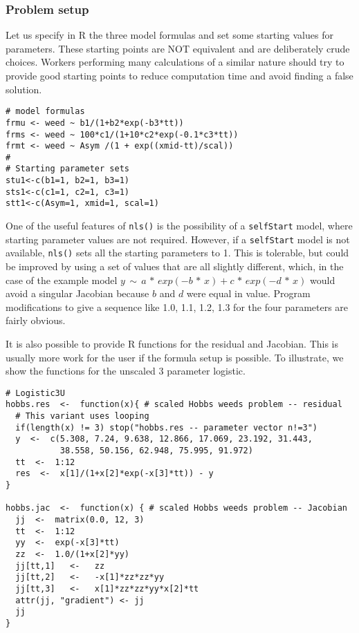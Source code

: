\hypertarget{problem-setup}{%
\subsubsection{Problem setup}\label{problem-setup}}

Let us specify in R the three model formulas and set some starting
values for parameters. These starting points are NOT equivalent and
are deliberately crude choices. Workers performing many calculations
of a similar nature should try to provide good starting points to reduce
computation time and avoid finding a false solution.

\begin{verbatim}
# model formulas
frmu <- weed ~ b1/(1+b2*exp(-b3*tt))
frms <- weed ~ 100*c1/(1+10*c2*exp(-0.1*c3*tt))
frmt <- weed ~ Asym /(1 + exp((xmid-tt)/scal))
#
# Starting parameter sets
stu1<-c(b1=1, b2=1, b3=1)
sts1<-c(c1=1, c2=1, c3=1)
stt1<-c(Asym=1, xmid=1, scal=1)
\end{verbatim}

One of the useful features of \texttt{nls()} is the possibility of a \texttt{selfStart} model,
where starting parameter values are not required. However, if a \texttt{selfStart} model
is not available, \texttt{nls()} sets all the starting parameters
to 1. This is tolerable, but could be improved by using a set of values
that are all slightly different, which, in the case of the example
model \(y \,\sim\, a \,*\, exp(-b \,*\, x) + c\,*\,exp(-d \,*\, x)\)
would avoid a singular Jacobian because \(b\) and \(d\) were equal in value.
Program modifications to give a sequence like 1.0, 1.1, 1.2, 1.3 for the four
parameters are fairly obvious.

It is also possible to provide R functions for the residual and Jacobian.
This is usually more work for the user if the formula setup is possible.
To illustrate, we show the functions for the unscaled 3 parameter logistic.

\begin{verbatim}
# Logistic3U
hobbs.res  <-  function(x){ # scaled Hobbs weeds problem -- residual
  # This variant uses looping
  if(length(x) != 3) stop("hobbs.res -- parameter vector n!=3")
  y  <-  c(5.308, 7.24, 9.638, 12.866, 17.069, 23.192, 31.443, 
           38.558, 50.156, 62.948, 75.995, 91.972)
  tt  <-  1:12
  res  <-  x[1]/(1+x[2]*exp(-x[3]*tt)) - y
}

hobbs.jac  <-  function(x) { # scaled Hobbs weeds problem -- Jacobian
  jj  <-  matrix(0.0, 12, 3)
  tt  <-  1:12
  yy  <-  exp(-x[3]*tt)
  zz  <-  1.0/(1+x[2]*yy)
  jj[tt,1]   <-   zz
  jj[tt,2]   <-   -x[1]*zz*zz*yy
  jj[tt,3]   <-   x[1]*zz*zz*yy*x[2]*tt
  attr(jj, "gradient") <- jj
  jj
}
\end{verbatim}

